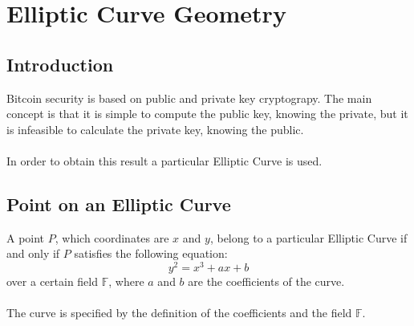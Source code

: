 
\chapter{Elliptic Curve Geometry} %

\label{EC} %


\newcommand{\keyword}[1]{\textbf{#1}}
\newcommand{\tabhead}[1]{\textbf{#1}}
\newcommand{\code}[1]{\texttt{#1}}
\newcommand{\file}[1]{\texttt{\bfseries#1}}
\newcommand{\option}[1]{\texttt{\itshape#1}}


\section{Introduction}
Bitcoin security is based on public and private key cryptograpy. The main concept is that it is simple to compute the public key, knowing the private, but it is infeasible to calculate the private key, knowing the public. \\ \\
In order to obtain this result a particular Elliptic Curve is used.

\section{Point on an Elliptic Curve}

A point $P$, which coordinates are $x$ and $y$, belong to a particular Elliptic Curve if and only if $P$ satisfies the following equation:
\begin{equation}\label{GeneralEC}
y^2=x^3+ax+b
\end{equation}
over a certain field $\mathbb{F}$, where $a$ and $b$ are the coefficients of the curve. \\ \\
The curve is specified by the definition of the coefficients and the field $\mathbb{F}$.

